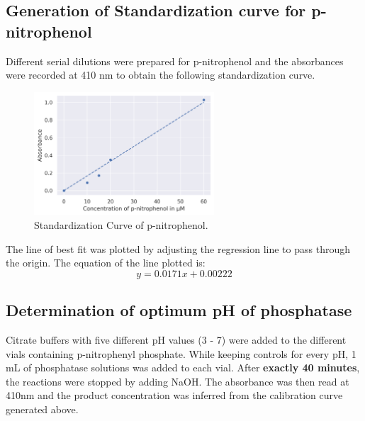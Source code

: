 \documentclass[pdflatex,sn-mathphys]{sn-jnl}%
\theoremstyle{thmstyleone}%
\theoremstyle{thmstyletwo}%
\theoremstyle{thmstylethree}%
\begin{document}
\subsection{Generation of Standardization curve for p-nitrophenol}
Different serial dilutions were prepared for p-nitrophenol and the absorbances
were recorded at 410 nm to obtain the following standardization curve.
\begin{figure}[h]
  \centering
  \includegraphics[width=0.6\textwidth]{photos/standardization_curve.png}
  \caption{Standardization Curve of p-nitrophenol. }\label{fig1}
\end{figure}
The line of best fit was plotted by adjusting the regression line to pass through the origin. The equation of the line plotted is:
\[y = 0.0171x + 0.00222\]
\subsection{Determination of optimum pH of phosphatase}
Citrate buffers with five different pH values (3 - 7) were added to the
different vials containing p-nitrophenyl phosphate. While keeping controls for
every pH, 1 mL of phosphatase solutions was added to each vial. After
\textbf{exactly 40 minutes}, the reactions were stopped by adding NaOH. The
absorbance was then read at 410nm and the product concentration was inferred
from the calibration curve generated above.
\end{document}
